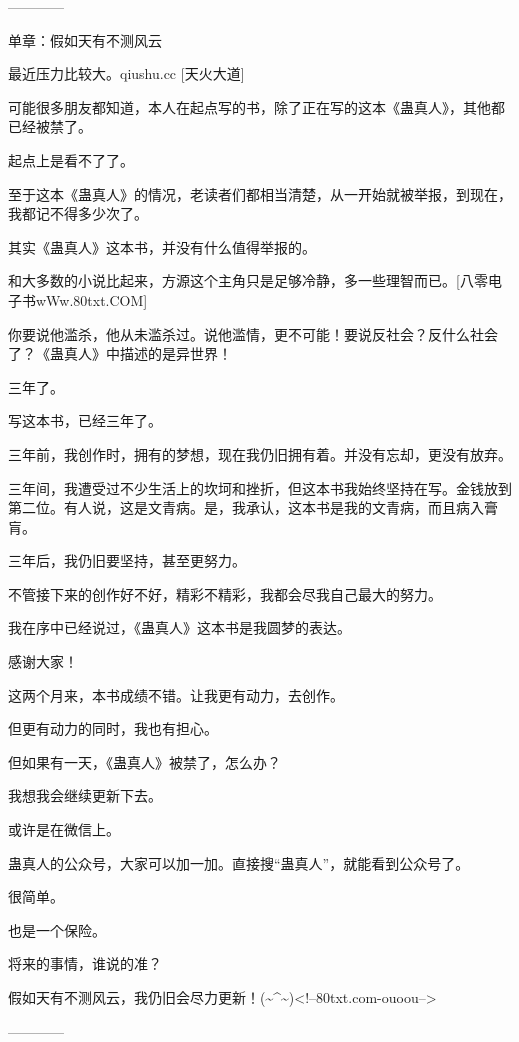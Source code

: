 \begin{this_body}
------------

单章：假如天有不测风云

最近压力比较大。qiushu.cc [天火大道]

可能很多朋友都知道，本人在起点写的书，除了正在写的这本《蛊真人》，其他都已经被禁了。

起点上是看不了了。

至于这本《蛊真人》的情况，老读者们都相当清楚，从一开始就被举报，到现在，我都记不得多少次了。

其实《蛊真人》这本书，并没有什么值得举报的。

和大多数的小说比起来，方源这个主角只是足够冷静，多一些理智而已。[八零电子书wWw.80txt.COM]

你要说他滥杀，他从未滥杀过。说他滥情，更不可能！要说反社会？反什么社会了？《蛊真人》中描述的是异世界！

三年了。

写这本书，已经三年了。

三年前，我创作时，拥有的梦想，现在我仍旧拥有着。并没有忘却，更没有放弃。

三年间，我遭受过不少生活上的坎坷和挫折，但这本书我始终坚持在写。金钱放到第二位。有人说，这是文青病。是，我承认，这本书是我的文青病，而且病入膏肓。

三年后，我仍旧要坚持，甚至更努力。

不管接下来的创作好不好，精彩不精彩，我都会尽我自己最大的努力。

我在序中已经说过，《蛊真人》这本书是我圆梦的表达。

感谢大家！

这两个月来，本书成绩不错。让我更有动力，去创作。

但更有动力的同时，我也有担心。

但如果有一天，《蛊真人》被禁了，怎么办？

我想我会继续更新下去。

或许是在微信上。

蛊真人的公众号，大家可以加一加。直接搜“蛊真人”，就能看到公众号了。

很简单。

也是一个保险。

将来的事情，谁说的准？

假如天有不测风云，我仍旧会尽力更新！(\~{}\^{}\~{})<!--80txt.com-ouoou-->

------------

\end{this_body}


